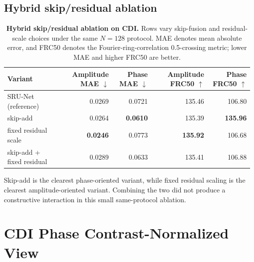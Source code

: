 \documentclass[11pt]{article}
\begin{document}
\subsection{Hybrid skip/residual ablation}

\begin{table}[t]
\centering
\small
\caption{\textbf{Hybrid skip/residual ablation on CDI.} Rows vary
skip-fusion and residual-scale choices under the same $N=128$ protocol. MAE
denotes mean absolute error, and FRC50 denotes the Fourier-ring-correlation
0.5-crossing metric; lower MAE and higher FRC50 are better.}
\label{tab:cdi_skip_residual_ablation}
\begin{tabular}{lrrrr}
\toprule
Variant & Amplitude MAE $\downarrow$ & Phase MAE $\downarrow$ &
Amplitude FRC50 $\uparrow$ & Phase FRC50 $\uparrow$ \\
\midrule
SRU-Net (reference) & 0.0269 & 0.0721 & 135.46 & 106.80 \\
skip-add & 0.0264 & \textbf{0.0610} & 135.39 & \textbf{135.96} \\
fixed residual scale & \textbf{0.0246} & 0.0773 & \textbf{135.92} & 106.68 \\
skip-add + fixed residual & 0.0289 & 0.0633 & 135.41 & 106.88 \\
\bottomrule
\end{tabular}
\end{table}

Skip-add is the clearest phase-oriented variant, while fixed residual scaling is
the clearest amplitude-oriented variant. Combining the two did not produce a
constructive interaction in this small same-protocol ablation.
\fi

\clearpage
\appendix

\section{CDI Phase Contrast-Normalized View}
\end{document}
